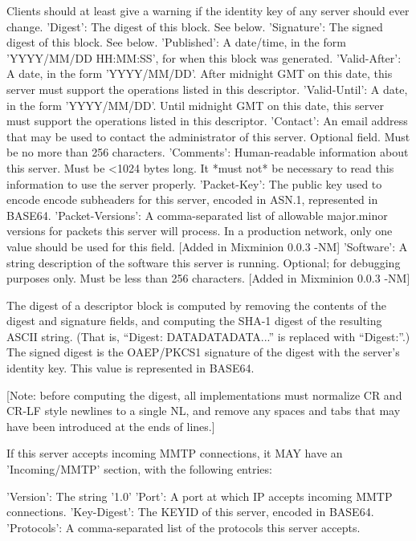 	 Clients should at least give a warning if the identity key of
         any server should ever change.
     'Digest': The digest of this block. See below.
     'Signature': The signed digest of this block.  See below.
     'Published': A date/time, in the form 'YYYY/MM/DD HH:MM:SS',
         for when this block was generated.
     'Valid-After': A date, in the form 'YYYY/MM/DD'.  After midnight GMT
         on this date, this server must support the operations listed
         in this descriptor.
     'Valid-Until': A date, in the form 'YYYY/MM/DD'.  Until midnight
         GMT on this date, this server must support the operations listed
         in this descriptor.
     'Contact': An email address that may be used to contact the
         administrator of this server. Optional field.  Must be no
         more than 256 characters.
     'Comments': Human-readable information about this server.  Must
         be <1024 bytes long.  It *must not* be necessary to read this
         information to use the server properly.
     'Packet-Key': The public key used to encode encode subheaders for
         this server, encoded in ASN.1, represented in BASE64. 
     'Packet-Versions': A comma-separated list of allowable major.minor
         versions for packets this server will process.  In a
         production network, only one value should be used for this
         field. [Added in Mixminion 0.0.3 -NM]
     'Software': A string description of the software this server is
         running.  Optional; for debugging purposes only.  Must be
         less than 256 characters. [Added in Mixminion 0.0.3 -NM]
 
The digest of a descriptor block is computed by removing the contents of the
digest and signature fields, and computing the SHA-1 digest of the resulting
ASCII string.  (That is, ``Digest: DATADATADATA...'' is replaced with
``Digest:''.)  The signed digest is the OAEP/PKCS1 signature of the digest
with the server's identity key.  This value is represented in BASE64.

[Note: before computing the digest, all implementations must normalize CR and
CR-LF style newlines to a single NL, and remove any spaces and tabs that may
have been introduced at the ends of lines.]

If this server accepts incoming MMTP connections, it MAY have an
'Incoming/MMTP' section, with the following entries:

     'Version': The string '1.0'
     'Port': A port at which IP accepts incoming MMTP connections.
     'Key-Digest': The KEYID of this server, encoded in BASE64.
     'Protocols': A comma-separated list of the protocols this
           server accepts.

